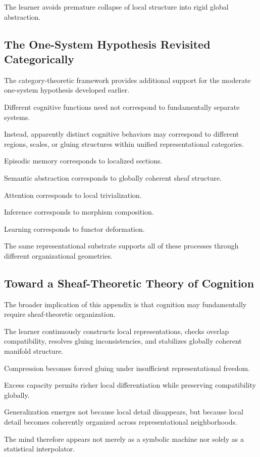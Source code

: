 \documentclass[12pt,a4paper]{article}
\begin{document}
The learner avoids premature collapse of local structure into rigid global abstraction.

\subsection{The One-System Hypothesis Revisited Categorically}

The category-theoretic framework provides additional support for the moderate one-system hypothesis developed earlier.

Different cognitive functions need not correspond to fundamentally separate systems.

Instead, apparently distinct cognitive behaviors may correspond to different regions, scales, or gluing structures within unified representational categories.

Episodic memory corresponds to localized sections.

Semantic abstraction corresponds to globally coherent sheaf structure.

Attention corresponds to local trivialization.

Inference corresponds to morphism composition.

Learning corresponds to functor deformation.

The same representational substrate supports all of these processes through different organizational geometries.

\subsection{Toward a Sheaf-Theoretic Theory of Cognition}

The broader implication of this appendix is that cognition may fundamentally require sheaf-theoretic organization.

The learner continuously constructs local representations, checks overlap compatibility, resolves gluing inconsistencies, and stabilizes globally coherent manifold structure.

Compression becomes forced gluing under insufficient representational freedom.

Excess capacity permits richer local differentiation while preserving compatibility globally.

Generalization emerges not because local detail disappears, but because local detail becomes coherently organized across representational neighborhoods.

The mind therefore appears not merely as a symbolic machine nor solely as a statistical interpolator.
\end{document}
